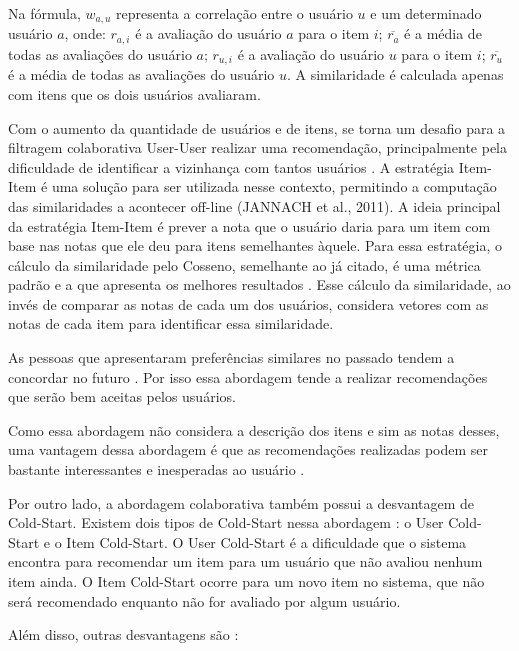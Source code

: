 Na fórmula, $w_{a,u}$ representa a correlação entre o usuário $u$ e um determinado usuário $a$, onde: $r_{a,i}$ é a avaliação
do usuário $a$ para o item $i$; $\overline{r_a}$ é a média de todas as avaliações do usuário $a$; $r_{u,i}$ é a avaliação do usuário
$u$ para o item $i$; $\overline{r_u}$ é a média de todas as avaliações do usuário $u$. A similaridade é calculada apenas com
itens que os dois usuários avaliaram.

Com o aumento da quantidade de usuários e de itens, se torna um desafio para a filtragem colaborativa User-User
realizar uma recomendação, principalmente pela dificuldade de identificar a vizinhança com tantos usuários
\cite{jannach2010recommender}. A estratégia Item-Item é uma solução para ser utilizada nesse contexto, permitindo a
computação das similaridades a acontecer off-line (JANNACH et al., 2011). A ideia principal da estratégia Item-Item
é prever a nota que o usuário daria para um item com base nas notas que ele deu para itens semelhantes àquele. Para
essa estratégia, o cálculo da similaridade pelo Cosseno, semelhante ao já citado, é uma métrica padrão e a que
apresenta os melhores resultados \cite{jannach2010recommender}. Esse cálculo da similaridade, ao invés de comparar
as notas de cada um dos usuários, considera vetores com as notas de cada item para identificar essa similaridade.

As pessoas que apresentaram preferências similares no passado tendem a concordar no futuro \cite{ricci2011introduction}.
Por isso essa abordagem tende a realizar recomendações que serão bem aceitas pelos usuários.

Como essa abordagem não considera a descrição dos itens e sim as notas desses, uma vantagem dessa abordagem é que as
recomendações realizadas podem ser bastante interessantes e inesperadas ao usuário \cite{ricci2011introduction}.

Por outro lado, a abordagem colaborativa também possui a desvantagem de Cold-Start. Existem dois tipos de Cold-Start
nessa abordagem \cite{adomavicius2005toward}: o User Cold-Start e o Item Cold-Start. O User Cold-Start é a dificuldade
que o sistema encontra para recomendar um item para um usuário que não avaliou nenhum item ainda. O Item Cold-Start
ocorre para um novo item no sistema, que não será recomendado enquanto não for avaliado por algum usuário.

Além disso, outras desvantagens são \cite{adomavicius2005toward}:

